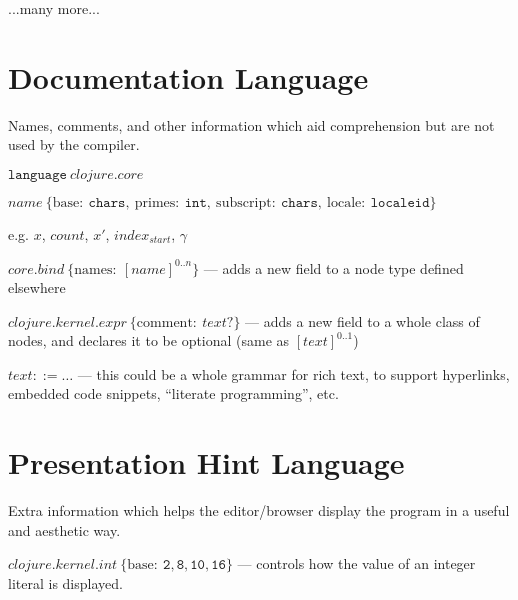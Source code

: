 \documentclass[110pt]{amsart}
\newcommand{\keyword}[1]{\ensuremath{\mathtt{#1}}}
\newcommand{\node}[2]{\ensuremath{#1 \: \{ #2 \}}}
\newcommand{\attr}[2]{\ensuremath{\mathrm{#1} : \: #2}}
\begin{document}
\vspace{12pt}

...many more...

\vspace{12pt}


\section{Documentation Language}
Names, comments, and other information which aid comprehension but are not used by the compiler.

\vspace{12pt}

$\keyword{language} \: clojure.core$


\vspace{12pt}

$\node{name}{\attr{base}{\keyword{chars}}, \: 
				\attr{primes}{\keyword{int}, \:
				\attr{subscript}{\keyword{chars}}}, \:
				\attr{locale}{\keyword{localeid}}}$
				
e.g. $x$, $count$, $x'$, $index_{start}$, $\gamma$

\vspace{12pt}

$\node{core.bind}{\attr{names}{[ name ]^{0..n}}}$  --- adds a new field to a node type defined elsewhere


\vspace{12pt}

$\node{clojure.kernel.expr}{\attr{comment}{text?}}$  --- adds a new field to a whole class of nodes, and declares it to be optional (same as $[text]^{0..1}$)


\vspace{12pt}
$text ::= \dots$  --- this could be a whole grammar for rich text, to support hyperlinks, embedded code snippets, ``literate programming'', etc.

\section{Presentation Hint Language}
Extra information which helps the editor/browser display the program in a useful and aesthetic way.

\vspace{12pt}

$\node{clojure.kernel.int}{\attr{base}{\keyword{2, 8, 10, 16}}}$  --- controls how the value of an integer literal is displayed.
\end{document}
